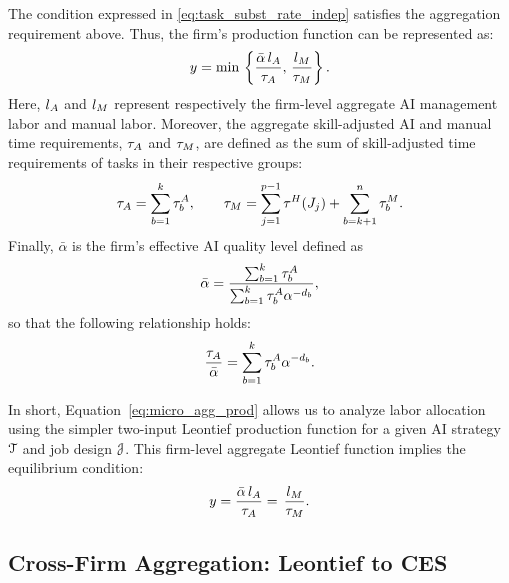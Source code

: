 The condition expressed in \eqref{eq:task_subst_rate_indep} satisfies the aggregation requirement above.
Thus, the firm's production function can be represented as:
\begin{equation}
y=\min\,\left\{\frac{\bar{\alpha}\,l_{A}}{\tau_{A}},\,\frac{l_{M}}{\tau_{M}}\right\}.\label{eq:micro_agg_prod}
\end{equation}
Here, $l_{A}$ and $l_{M}$ represent respectively the firm-level aggregate AI management labor and manual labor.
Moreover, the aggregate skill-adjusted AI and manual time requirements, $\tau_{A}$ and $\tau_{M}$, are defined as the sum of skill-adjusted time requirements of tasks in their respective groups:
\begin{equation}
\tau_{A} = \sum_{b=1}^{k}\tau^{A}_{b}, \qquad
\tau_{M} = \sum_{j=1}^{p-1}\tau^{H}_{}(J_j) + \sum_{b=k+1}^{n}\tau^{M}_{b}. \label{eq:def_t_AI}
\end{equation}
Finally, $\bar{\alpha}$ is the firm's effective AI quality level defined as
\begin{equation}
\bar{\alpha}=\frac{\sum_{b=1}^{k}\tau^{A}_{b}}{\sum_{b=1}^{k}\tau^{A}_{b}\alpha^{-d_{b}}},\label{eq:alpha_bar}
\end{equation}
so that the following relationship holds:
\[
\frac{\tau_{A}}{\bar{\alpha}}=\sum_{b=1}^{k}\tau^{A}_{b}\alpha^{-d_{b}}.
\]

In short, Equation~\eqref{eq:micro_agg_prod} allows us to analyze labor allocation using the simpler two-input Leontief production function for a given AI strategy \( \mathcal{T} \) and job design \( \mathcal{J} \).
This firm-level aggregate Leontief function implies the equilibrium condition:
\begin{equation}
y=\frac{\bar{\alpha}\,l_{A}}{\tau_{A}}
=\,\frac{l_{M}}{\tau_{M}}.
\label{eq:micro_fixed_proportions}
\end{equation}



\subsection{Cross-Firm Aggregation: Leontief to CES}

